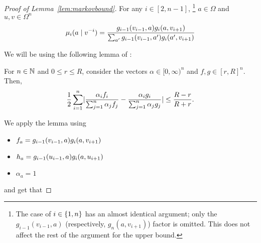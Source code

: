 \documentclass[12pt,a4paper,oneside,onecolumn]{book}
\begin{document}
\begin{proof}[Proof of Lemma~\ref{lem:markovbound}]
For any $i\in [2,n-1]$,
\footnote{The case of $i\in\left\{ 1,n \right\}$ 
has an almost identical argument;
only the $g_{i-1}(v_{i-1},a)$ (respectively, $g_n(a,v_{i+1})$) factor
is omitted.
This does not affect the rest of the argument for the upper bound.
}
$a \in \Omega$ and $u,v \in \Omega^n$
\begin{align*}
  \mu_i(a\mid v^{-i})
  = \frac{g_{i-1}(v_{i-1},a)g_{i}(a,v_{i+1})}
  {\sum_{a'}g_{i-1}(v_{i-1},a')g_{i}(a',v_{i+1})}
\end{align*}

We will be using the following lemma of \citet{kontorovich12}:
\begin{lemma}
  For $n\in\mathbb{N}$ and $0\leq r\leq R$, consider the vectors ${\alpha}\in [0,\infty)^n$ and $f,g\in [r,R]^n$.
  Then,
  \[
  \frac{1}{2}\sum_{i=1}^n \lvert\frac{\alpha_i f_i}{\sum_{j=1}^n \alpha_j f_j} - \frac{\alpha_i g_i}{\sum_{j=1}^n \alpha_j g_j}\rvert
  \leq
  \frac{R-r}{R+r}
  .
  \]
\end{lemma}
We apply the lemma using
\begin{itemize}
\item $f_a = g_{i-1}(v_{i-1},a)g_{i}(a,v_{i+1})$
\item $h_a = g_{i-1}(u_{i-1},a)g_{i}(a,u_{i+1})$
\item $\alpha_a = 1$
\end{itemize}

and get that


\end{proof}
\end{document}
